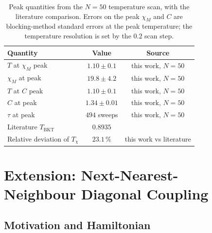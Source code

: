 \documentclass[11pt,a4paper]{article}
\begin{document}
\begin{table}[H]
    \centering
    \caption{Peak quantities from the $N = 50$ temperature scan, with
             the literature comparison. Errors on the peak $\chi_M$ and
             $C$ are blocking-method standard errors at the peak temperature;
             the temperature resolution is set by the $0.2$ scan step.}
    \label{tab:summary}
    \begin{tabular}{lcc}
        \toprule
        Quantity                              & Value                & Source \\
        \midrule
        $T$ at $\chi_M$ peak                  & $1.10 \pm 0.1$              & this work, $N = 50$ \\
        $\chi_M$ at peak                      & $19.8 \pm 4.2$              & this work, $N = 50$ \\
        $T$ at $C$ peak                       & $1.10 \pm 0.1$              & this work, $N = 50$ \\
        $C$ at peak                           & $1.34 \pm 0.01$             & this work, $N = 50$ \\
        $\tau$ at peak                        & $494$ sweeps                & this work, $N = 50$ \\
        Literature $T_{\mathrm{BKT}}$         & $0.8935$                    & \citet{hasenbusch2005} \\
        Relative deviation of $T_{\chi}$      & $23.1\,\%$                  & this work vs literature \\
        \bottomrule
    \end{tabular}
\end{table}

\section{Extension: Next-Nearest-Neighbour Diagonal Coupling}
\label{sec:extension}

\subsection{Motivation and Hamiltonian}
\label{sec:ext_motivation}
\end{document}
